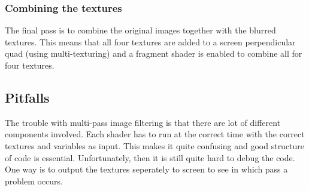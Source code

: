 \documentclass[a4paper,12pt]{article}
\begin{document}
\subsubsection{Combining the textures}
\label{sec:CombiningTheTextures}

The final pass is to combine the original images together with the blurred textures. This means that all four textures are added to a screen perpendicular quad (using multi-texturing) and a fragment shader is enabled to combine all for four textures.

\subsection{Pitfalls}
\label{sec:PitfallsBloomShader}
The trouble with multi-pass image filtering is that there are lot of different components involved. Each shader has to run at the correct time with the correct textures and variables as input. This makes it quite confusing and good structure of code is essential. Unfortunately, then it is still quite hard to debug the code. One way is to output the textures seperately to screen to see in which pass a problem occurs.
\end{document}

